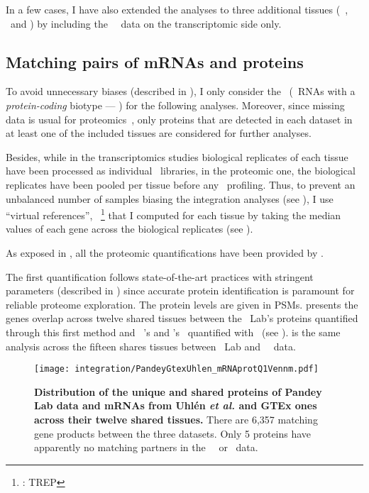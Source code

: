 In a few cases, I have also extended the analyses
to three additional tissues (\ie\ \Gall, \Placenta\ and \Rectum)
by including the \uhlen\ \etal\ data on the transcriptomic side only.

\subsection{Matching pairs of mRNAs and proteins}
\vspace{-4mm}
To avoid unnecessary biases (described in ),
I only consider the \mRNAs\
(\ie\ \glspl{RNA} with a \emph{protein-coding} biotype --- )
for the following analyses.
Moreover, since missing data is usual for proteomics~,
only proteins that are detected in each dataset
in at least one of the included tissues
are considered for further analyses.

Besides,
while in the transcriptomics studies
biological replicates of each tissue have been processed
as individual \Rnaseq\ libraries,
in the proteomic one,
the biological replicates have been pooled per tissue before any \ms\ profiling.
Thus, to prevent an unbalanced number of samples biasing
the integration analyses (see ),
I use \enquote{virtual references},
\ie\ \treps\footnote{\trep{}: \glsdesc{TREP}}
that I computed for each tissue
by taking the median values of each gene
across the biological replicates
(see ).

As exposed in ,
all the proteomic quantifications have been provided by \james.

The first quantification follows state-of-the-art practices
with stringent parameters (described in )
since accurate protein identification is paramount
for reliable proteome exploration.
The protein levels are given in \glspl{PSM}.
 presents
the genes overlap across twelve shared tissues
between the \pandey\ Lab's proteins quantified through this first method
and \uhlen\ \etal{}'s and \gtex{}'s \mRNAs\ quantified
with \htseq\ (see ).
 is the same analysis across the fifteen shares tissues
between \pandey\ Lab and \uhlen\ \etal\ data.\mybr\

\begin{figure}[!htb]
    \texttt{[image: integration/PandeyGtexUhlen\_mRNAprotQ1Vennm.pdf]}\centering
    \vspace{-5mm}
    \caption[Distribution of the unique and shared proteins/mRNAs for the three datasets
    across twelve tissues]{%
    \label{fig:PGU_vennQ1}\textbf{Distribution of the unique and shared proteins
    of Pandey Lab data and mRNAs from Uhlén \textit{et al.} and GTEx ones across
    their twelve shared tissues.}
    There are 6,357 matching gene products between the three datasets.
    Only 5 proteins have apparently no matching partners
    in the \uhlen\ \etal\ or \gtex\ data.}
\end{figure}


